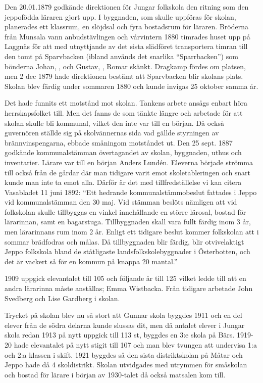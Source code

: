 
Den 20.01.1879 godkände direktionen för Jungar folkskola den ritning som den jeppofödda läraren  gjort upp. I byggnaden, som skulle uppföras för skolan, planerades ett klassrum, en slöjdsal och fyra bostadsrum för läraren. Bröderna  från Munsala vann anbudstävlingen och vårvintern 1880 timrades huset upp på Laggnäs för att med utnyttjande av det sista slädföret transportera timran till den tomt på Sparvbacken (ibland används det snarlika ``Sparrbacken'') som bönderna Johan, , och Gustav, , Romar skänkt. Dragkamp fördes om platsen, men 2 dec 1879 hade direktionen bestämt att Sparvbacken blir skolans plats. Skolan blev färdig under sommaren 1880 och kunde invigas 25 oktober samma år.

Det hade funnits ett motstånd mot skolan. Tankens arbete ansågs enbart höra herrskapsfolket till. Men det fanns de som tänkte längre och arbetade för att skolan skulle bli kommunal, vilket den inte var till en början. Då också guvernören ställde sig på skolvännernas sida vad gällde styrningen av brännvinspengarna, ebbade småningom motståndet ut. Den 25 sept. 1887 godkände kommunalstämman övertagandet av skolan, byggnaden, uthus och inventarier. Lärare var till en början Anders Lundén. Eleverna började strömma till också från de gårdar där man tidigare varit emot skoletableringen och snart kunde man inte ta emot alla. Därför är det  med tillfredställelse vi kan citera Vasabladet 11 juni 1892: ``Ett hedrande kommunalstämmobeslut fattades i Jeppo vid kommunalstämman den 30 maj. Vid stämman beslöts nämligen att vid folkskolan skulle tillbyggas en vinkel innehållande en större lärosal, bostad för lärarinnan, samt en bagarstuga. Tillbyggnaden skall vara fullt färdig inom 3 år, men lärarinnans rum inom 2 år. Enligt ett tidigare beslut kommer folkskolan att i sommar brädfodras och målas. Då tillbyggnaden blir färdig, blir otvivelaktigt Jeppo folkskola bland de ståtligaste landsfolkskolebyggnader i Österbotten, och det är vackert så för en kommun på knappa 20 mantal.''

1909 uppgick elevantalet till 105 och följande år till 125 vilket ledde till att en andra lärarinna måste anställas; Emma Wistbacka. Från
tidigare arbetade John Svedberg och Lise Gardberg i skolan.

Trycket på skolan blev nu så stort att Gunnar skola byggdes 1911 och en del elever från de södra delarna kunde slussas dit, men då antalet elever i Jungar skola redan 1913 på nytt uppgick till 113 st, byggdes en 3:e skola på Bärs. 1919-20 hade elevantalet på nytt stigit till 107 och man blev tvungen att undervisa 1:a och 2:a klassen i skift. 1921 byggdes så den sista distriktskolan på Måtar och Jeppo hade då 4  skoldistrikt. Skolan utvidgades med utrymmen för småskolan och bostad för lärare i början av 1930-talet då också matsalen kom till.

